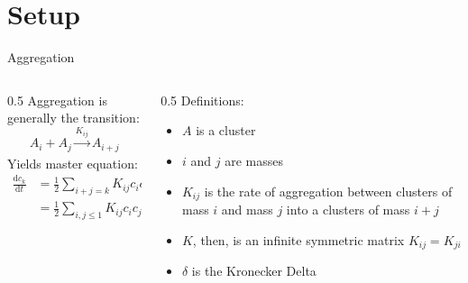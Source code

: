 \documentclass{beamer}
\begin{document}
\section{Setup}
\begin{frame}{Aggregation}
    \begin{columns}
        \begin{column}{0.5\textwidth}
            Aggregation is generally the transition:
            $$
                A_{i} + A_{j} \xrightarrow[]{K_{ij}} A_{i+j}
            $$
            Yields master equation:
            \begin{align*}
                \frac{\mathrm{d} c_{k}}{\mathrm{d} t }
                 & = \frac{1}{2} \sum_{i+j=k} K_{ij} c_{i} c_{j} - c_{k} \sum_{i \geq  1} K_{ik}c_{i}\,                            \\
                 & = \frac{1}{2} \sum_{i, j \leq  1} K_{ij} c_{i} c_{j} \Big[\delta_{i+j, k} - \delta_{i, k} - \delta_{j, k} \Big]
            \end{align*}
        \end{column}
        \begin{column}{0.5\textwidth}
            Definitions:
            \begin{itemize}
                \item $A$ is a cluster
                \item $i$ and $j$ are masses
                \item $K_{ij}$ is the rate of aggregation between clusters of mass $i$ and mass $j$ into a clusters of mass $i +j$
                \item $K$, then, is an infinite symmetric matrix $K_{ij}=K_{ji}$
                \item $\delta$ is the Kronecker Delta
            \end{itemize}
        \end{column}
    \end{columns}
\end{frame}
\end{document}
